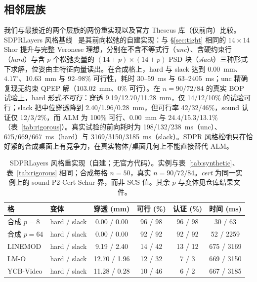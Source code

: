 \subsection{相邻层族}\label{sec:neigh}
我们与最接近的两个层族的两份重实现以及官方 Theseus 库（仅前向）比较。SDPRLayers 风格基线~\cite{holmes2025sdpr} 是其前向松弛的自建实现：与 \S\ref{sec:tight} 相同的 $14\times14$ Shor 提升与完整 Veronese 理想，分别在不含不等式行（\emph{unc}）、含硬约束行（\emph{hard}）与含 $p$ 个松弛变量的 $(14+p)\times(14+p)$ PSD 块（\emph{slack}）三种形式下求解，位姿由主特征向量读出。在合成格上，hard 与 slack 达到 0.00~mm、$4.17^\circ$、10.63~mm 与 92--98\% 可行性，耗时 30--59~ms 与 63--2405~ms；unc 精确复现无约束 QPEP 解（103.02~mm、0\% 可行）。在 $n=90/72/84$ 的真实 BOP 试验上，hard 形式\emph{不可行}：穿透 9.19/12.70/11.28~mm，仅 14/12/10\% 的试验可行；slack 把中位穿透降到 2.40/1.96/0.28~mm，但可行率 42/32/46\%，sound 认证仅 12/3/2\%，而 ALM 为 100\% 可行、0.00~mm 与 24.4/15.3/13.1\%（表~\ref{tab:rigorous}）。真实试验的前向耗时为 198/132/238~ms（unc）、675/669/667~ms（hard）与 3169/3150/3185~ms（slack）。SDPR 风格松弛只在恰好紧的合成桌面上有竞争力，在真实物体/桌面几何上不能直接替代 ALM。

\begin{table}[t]
\centering
\caption{SDPRLayers 风格重实现（自建；无官方代码）。实例与表~\ref{tab:synthetic}、表~\ref{tab:rigorous} 相同；合成每格 $n=50$，真实 $n=90/72/84$。\emph{cert} 为同一实例上的 sound P2-Cert Schur 界，而非 SCS 值。其余 $p$ 与变体见仓库结果文件。}
\label{tab:sdpr}
\scriptsize
\setlength{\tabcolsep}{3pt}
\begin{tabular}{@{}llcccc@{}}
\toprule
格 & 变体 & 穿透 (mm) & 可行 (\%) & 认证 (\%) & 时间 (ms) \\
\midrule
合成 $p{=}8$ & hard / slack & 0.00 / 0.00 & 96 / 98 & 96 / 98 & 30 / 63 \\
合成 $p{=}64$ & hard / slack & 0.00 / 0.00 & 92 / 92 & 92 / 92 & 52 / 2259 \\
LINEMOD & hard / slack & 9.19 / 2.40 & 14 / 42 & 13 / 12 & 675 / 3169 \\
LM-O & hard / slack & 12.70 / 1.96 & 12 / 32 & 7 / 3 & 669 / 3150 \\
YCB-Video & hard / slack & 11.28 / 0.28 & 10 / 46 & 6 / 2 & 667 / 3185 \\
\bottomrule
\end{tabular}
\end{table}

